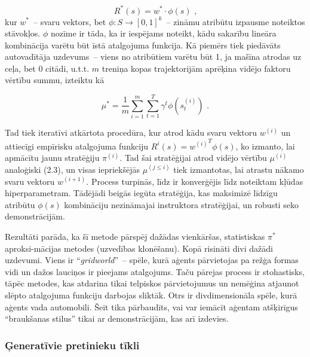 \documentclass[12pt, a4paper]{article}
\numberwithin{equation}{section} %
\begin{document}
\begin{equation}
    R^*(s) = w^* \cdot \phi(s)
\text{ ,}
\end{equation}
kur $w^*$~-- svaru vektors, bet $\phi: S \rightarrow [0,1]^k$~-- zināmu atribūtu izpausme noteiktos stāvokļos. $\phi$ nozīme ir tāda, ka ir iespējams noteikt, kādu sakarību lineāra kombinācija varētu būt īstā atalgojuma funkcija. Kā piemērs tiek piedāvāts autovadītāja uzdevums~-- viens no atribūtiem varētu būt 1, ja mašīna atrodas uz ceļa, bet 0 citādi, u.t.t. $m$ treniņa kopas trajektorijām aprēķina vidējo faktoru vērtību summu, izteiktu kā

\begin{equation}
    \mu^* = \frac{1}{m}\sum_{i=1}^m\sum_{t=1}^T \gamma^t \phi(s^{(i)}_t)
\text{ .}
\end{equation}

Tad tiek iteratīvi atkārtota procedūra, kur atrod kādu svaru vektoru $w^{(i)}$ un attiecīgi empīrisku atalgojuma funkciju $R^{i}(s) = {w^{(i)}}^T\phi(s)$, ko izmanto, lai apmācītu jaunu stratēģiju $\pi^{(i)}$. Tad šai stratēģijai atrod vidējo vērtību $\mu^{(i)}$ analoģiski (2.3), un visas iepriekšējās $\mu^{(j \leq i)}$ tiek izmantotas, lai atrastu nākamo svaru vektoru $w^{(i+1)}$. Process turpinās, līdz ir konverģējis līdz noteiktam kļūdas hiperparametram. Tādējādi beigās iegūta stratēģija, kas maksimizē līdzīgu atribūtu $\phi(s)$ kombināciju nezināmajai instruktora stratēģijai, un robusti seko demonstrācijām.

Rezultāti parāda, ka šī metode pārspēj dažādas vienkāršas, statistiskas $\pi^*$ aproksi-mācijas metodes (uzvedības klonēšanu). Kopā risināti divi dažādi uzdevumi. Viens ir ``\textit{gridworld}''~-- spēle, kurā aģents pārvietojas pa režģa formas vidi un dažos lauciņos ir pieejams atalgojums. Taču pārejas process ir stohastisks, tāpēc metodes, kas atdarina tikai telpiskos pārvietojumus un nemēģina atjaunot slēpto atalgojuma funkciju darbojas sliktāk. Otrs ir divdimensionāla spēle, kurā aģents vada automobili. Šeit tika pārbaudīts, vai var iemācīt aģentam atšķirīgus ``braukšanas stilus'' tikai ar demonstrācijām, kas arī izdevies.

\subsubsection{Ģeneratīvie pretinieku tīkli}
\end{document}
